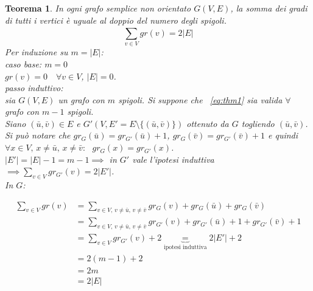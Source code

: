 \documentclass[a4paper, openany]{book}
\theoremstyle{plain}
\newtheorem{thm}{Teorema}[section]
\theoremstyle{definition}
\begin{document}
\begin{thm}
In ogni grafo semplice non orientato $G(V,E)$, la somma dei gradi di tutti i vertici è
uguale al doppio del numero degli spigoli.
\begin{equation} \label{eq:thm1} \sum_{v \in V}^{} gr(v) = 2|E| \end{equation}
\proof
	Per induzione su $m = |E|$:\\
	\emph{caso base: $m = 0$}\\	
	\indent $gr(v) = 0 \quad \forall v \in V$, \quad $|E| = 0$.\\
	\emph{passo induttivo:}\\
	\indent sia $G(V,E)$ un grafo con $m$ spigoli. Si suppone che ~\ref{eq:thm1} 
	sia valida $\forall$ grafo con $m-1$ spigoli.\\
	Siano $(\bar{u}, \bar{v}) \in E$ e $G'(V, E'=E \setminus \{(\bar{u}, \bar{v})\})$ ottenuto da $G$ togliendo 
	$(\bar{u}, \bar{v})$.\\
	Si può notare che $gr_G(\bar{u})= gr_{G'}(\bar{u})+1$, $gr_G(\bar{v}) = gr_{G'}(\bar{v})+1$ e quindi
	${\forall x \in V \text{, } x \neq \bar{u} \text{, }  x \neq \bar{v}: \text{ } gr_G(x) = gr_{G'}(x)}$.\\%
	$|E'| = |E|-1 = m -1 \implies$ in $G'$ vale l'ipotesi induttiva 
    ${\implies \sum_{v \in V}^{} gr_{G'}(v) = 2|E'|}$.\\In $G$:

    \begin{equation*}
    \begin{split}
	 \sum_{v \in V}^{} gr(v) & = 
     \sum_{v \in V \text{, } v \neq \bar{u} \text{, } v \neq \bar{v} }^{} 
        gr_G(v)+gr_G(\bar{u})+gr_G(\bar{v}) \\ & =
	 \sum_{v\in V\text{, }v\neq \bar{u}\text{, } v\neq \bar{v} }^{} 
        gr_{G'}(v)+gr_{G'}(\bar{u})+1 +gr_{G'}(\bar{v}) +1 \\ & =
	 \sum_{v \in V}^{} gr_{G'}(v) + 2 \underbrace{=}_{\text{ipotesi induttiva}} 2|E'| + 2 \\
     & = 2(m-1) + 2 \\
	 & = 2m \\ & = 2|E|
    \end{split}
    \end{equation*}
\endproof
\end{thm}
\end{document}
